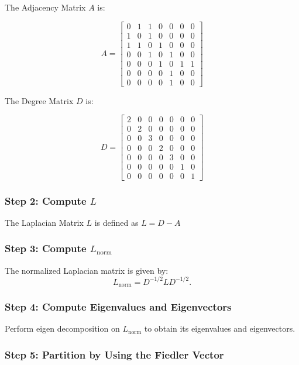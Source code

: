 \documentclass[12pt]{article}
\begin{document}
The Adjacency Matrix $A$ is:

\[
    A =
    \begin{bmatrix}
    0 & 1 & 1 & 0 & 0 & 0 & 0 \\
    1 & 0 & 1 & 0 & 0 & 0 & 0 \\
    1 & 1 & 0 & 1 & 0 & 0 & 0 \\
    0 & 0 & 1 & 0 & 1 & 0 & 0 \\
    0 & 0 & 0 & 1 & 0 & 1 & 1 \\
    0 & 0 & 0 & 0 & 1 & 0 & 0 \\
    0 & 0 & 0 & 0 & 1 & 0 & 0
    \end{bmatrix}
\]

The Degree Matrix $D$ is:

\[
    D =
    \begin{bmatrix}
    2 & 0 & 0 & 0 & 0 & 0 & 0 \\
    0 & 2 & 0 & 0 & 0 & 0 & 0 \\
    0 & 0 & 3 & 0 & 0 & 0 & 0 \\
    0 & 0 & 0 & 2 & 0 & 0 & 0 \\
    0 & 0 & 0 & 0 & 3 & 0 & 0 \\
    0 & 0 & 0 & 0 & 0 & 1 & 0 \\
    0 & 0 & 0 & 0 & 0 & 0 & 1
    \end{bmatrix}
\]

\subsubsection*{Step 2: Compute $L$}

The Laplacian Matrix $L$ is defined as $L = D - A$

\subsubsection*{Step 3: Compute $L_{\text{norm}}$}

The normalized Laplacian matrix is given by:
\[
L_{\text{norm}} = D^{-1/2} L D^{-1/2}.
\]

\subsubsection*{Step 4: Compute Eigenvalues and Eigenvectors}

Perform eigen decomposition on \(L_{\text{norm}}\) to obtain its eigenvalues and eigenvectors.

\subsubsection*{Step 5: Partition by Using the Fiedler Vector}
\end{document}
